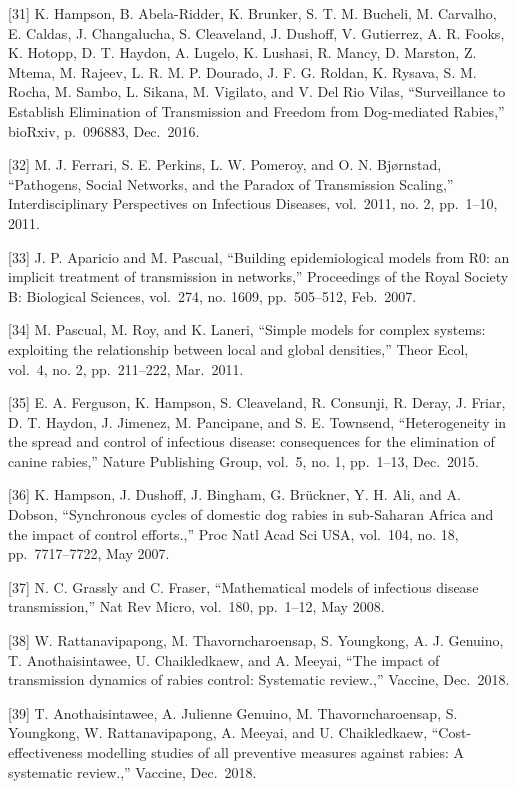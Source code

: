 \documentclass[
]{book}
\begin{document}
{[}31{]} K. Hampson, B. Abela-Ridder, K. Brunker, S. T. M. Bucheli, M. Carvalho, E. Caldas, J. Changalucha, S. Cleaveland, J. Dushoff, V. Gutierrez, A. R. Fooks, K. Hotopp, D. T. Haydon, A. Lugelo, K. Lushasi, R. Mancy, D. Marston, Z. Mtema, M. Rajeev, L. R. M. P. Dourado, J. F. G. Roldan, K. Rysava, S. M. Rocha, M. Sambo, L. Sikana, M. Vigilato, and V. Del Rio Vilas, ``Surveillance to Establish Elimination of Transmission and Freedom from Dog-mediated Rabies,'' bioRxiv, p.~096883, Dec.~2016.

{[}32{]} M. J. Ferrari, S. E. Perkins, L. W. Pomeroy, and O. N. Bjørnstad, ``Pathogens, Social Networks, and the Paradox of Transmission Scaling,'' Interdisciplinary Perspectives on Infectious Diseases, vol.~2011, no. 2, pp.~1--10, 2011.

{[}33{]} J. P. Aparicio and M. Pascual, ``Building epidemiological models from R0: an implicit treatment of transmission in networks,'' Proceedings of the Royal Society B: Biological Sciences, vol.~274, no. 1609, pp.~505--512, Feb.~2007.

{[}34{]} M. Pascual, M. Roy, and K. Laneri, ``Simple models for complex systems: exploiting the relationship between local and global densities,'' Theor Ecol, vol.~4, no. 2, pp.~211--222, Mar.~2011.

{[}35{]} E. A. Ferguson, K. Hampson, S. Cleaveland, R. Consunji, R. Deray, J. Friar, D. T. Haydon, J. Jimenez, M. Pancipane, and S. E. Townsend, ``Heterogeneity in the spread and control of infectious disease: consequences for the elimination of canine rabies,'' Nature Publishing Group, vol.~5, no. 1, pp.~1--13, Dec.~2015.

{[}36{]} K. Hampson, J. Dushoff, J. Bingham, G. Brückner, Y. H. Ali, and A. Dobson, ``Synchronous cycles of domestic dog rabies in sub-Saharan Africa and the impact of control efforts.,'' Proc Natl Acad Sci USA, vol.~104, no. 18, pp.~7717--7722, May 2007.

{[}37{]} N. C. Grassly and C. Fraser, ``Mathematical models of infectious disease transmission,'' Nat Rev Micro, vol.~180, pp.~1--12, May 2008.

{[}38{]} W. Rattanavipapong, M. Thavorncharoensap, S. Youngkong, A. J. Genuino, T. Anothaisintawee, U. Chaikledkaew, and A. Meeyai, ``The impact of transmission dynamics of rabies control: Systematic review.,'' Vaccine, Dec.~2018.

{[}39{]} T. Anothaisintawee, A. Julienne Genuino, M. Thavorncharoensap, S. Youngkong, W. Rattanavipapong, A. Meeyai, and U. Chaikledkaew, ``Cost-effectiveness modelling studies of all preventive measures against rabies: A systematic review.,'' Vaccine, Dec.~2018.
\end{document}
